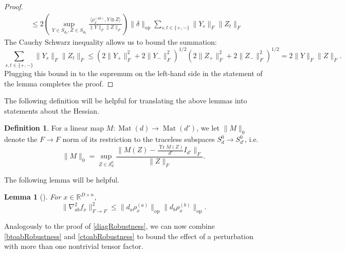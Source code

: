 \documentclass[aos]{imsart}
\newtheorem{lemma}[theorem]{Lemma}
\theoremstyle{definition}
\newtheorem{definition}[theorem]{Definition}
\numberwithin{equation}{section}
\DeclareMathOperator{\op}{op}
\DeclareMathOperator{\Mat}{Mat}
\DeclareMathOperator{\tr}{Tr}
\newcommand{\R}{{\mathbb{R}}}
\newcommand{\Sym}{\mathcal{S}}
\newcommand{\smallSym}{S}
\newcommand{\samp}{x}
\newcommand{\AR}[1]{{\color{orange}[AR: #1]}}
\newcommand{\AR}[1]{{}}
\begin{document}
\begin{appendix}
\begin{proof}
\begin{align*}
&\leq 2\left( \sup_{Y \in \smallSym_{d_{a}}, Z \in \smallSym_{d_{b}}} \frac{\langle \rho_{\samp}^{(ab)}, Y \otimes Z \rangle}{\|Y\|_{F} \|Z\|_{F}} \right) \|\delta\|_{\op} \sum_{s,t \in \{+,-\}} \|Y_{s}\|_{F} \|Z_{t}\|_{F}
\end{align*}
The Cauchy Schwarz inequality allows us to bound the summation:
\[\sum_{s,t \in \{+,-\}} \|Y_{s}\|_{F} \|Z_{t}\|_{F}  \leq (2\|Y_{+}\|_{F}^{2} + 2\|Y_{-}\|_{F}^{2})^{1/2} (2\|Z_{+}\|_{F}^{2} + 2\|Z_{-}\|_{F}^{2})^{1/2} = 2 \|Y\|_{F} \|Z\|_{F} .   \]
Plugging this bound in to the supremum on the left-hand side in the statement of the lemma completes the proof.
\end{proof}

The following definition will be helpful for translating the above lemmas into statements about the Hessian.
\begin{definition}
For a linear map $M : \Mat(d) \to \Mat(d')$, we let $\|M\|_{0}$ denote the $F \to F$ norm of its restriction to the traceless subspaces $\smallSym^0_{d} \to \smallSym^0_{d'}$, i.e.
$$ \|M\|_0 = \sup_{Z \in \Sym^0_{d}} \frac{\|M(Z) - \frac{\tr M(Z)}{d'} I_{d'}\|_F}{\|Z\|_F}.$$
\end{definition}
The following lemma will be helpful.

\begin{lemma}[\cite{KLR19}] \label{inftyto2} For $x \in \R^{D \times n}$,
$$\|\nabla^{2}_{ab} f_{\samp}\|_{F \to F}^{2} \leq \|d_{a} \rho_{\samp}^{(a)}\|_{\op} \|d_{b} \rho_{\samp}^{(b)}\|_{\op}.$$
\end{lemma}
Analogously to the proof of \cref{diagRobustness}, we can now combine \cref{btoabRobustness} and \cref{ctoabRobustness} to bound the effect of a perturbation with more than one nontrivial tensor factor.


\end{appendix}
\end{document}
